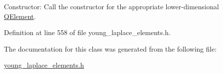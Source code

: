 Constructor\+: Call the constructor for the appropriate lower-\/dimensional \hyperlink{classoomph_1_1QElement}{Q\+Element}. 



Definition at line 558 of file young\+\_\+laplace\+\_\+elements.\+h.



The documentation for this class was generated from the following file\+:\begin{DoxyCompactItemize}
\item 
\hyperlink{young__laplace__elements_8h}{young\+\_\+laplace\+\_\+elements.\+h}\end{DoxyCompactItemize}
